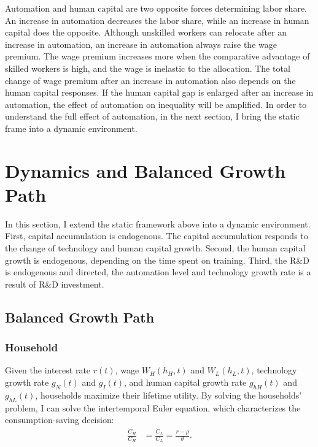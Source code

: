 \documentclass[12pt]{article}
\begin{document}
Automation and human capital are two opposite forces determining labor share. An increase in automation decreases the labor share, while an increase in human capital does the opposite. Although unskilled workers can relocate after an increase in automation, an increase in automation always raise the wage premium. The wage premium increases more when the comparative advantage of skilled workers is high, and the wage is inelastic to the allocation. The total change of wage premium after an increase in automation also depends on the human capital responses. If the human capital gap is enlarged after an increase in automation, the effect of automation on inequality will be amplified. In order to understand the full effect of automation, in the next section, I bring the static frame into a dynamic environment. 


\section{Dynamics and Balanced Growth Path}
In this section, I extend the static framework above into a dynamic environment. First, capital accumulation is endogenous. The capital accumulation responds to the change of technology and human capital growth. Second, the human capital growth is endogenous, depending on the time spent on training. Third, the R\&D is endogenous and directed, the automation level and technology growth rate is a result of R\&D investment.

\subsection{Balanced Growth Path}
\subsubsection*{Household}
Given the interest rate $r(t)$, wage $W_H(h_H,t)$ and $W_L(h_L,t)$, technology growth rate $g_N(t)$ and $g_I(t)$, and human capital growth rate $g_{hH}(t)$ and  $g_{hL}(t)$, households maximize their lifetime utility. By solving the households' problem, I can solve the intertemporal Euler equation, which characterizes the consumption-saving decision: 
\begin{align*}
\frac{\dot{C}_H}{C_H} &= \frac{\dot{C}_L}{C_L}  = \frac{r-\rho}{\theta}.
\end{align*}
\end{document}
